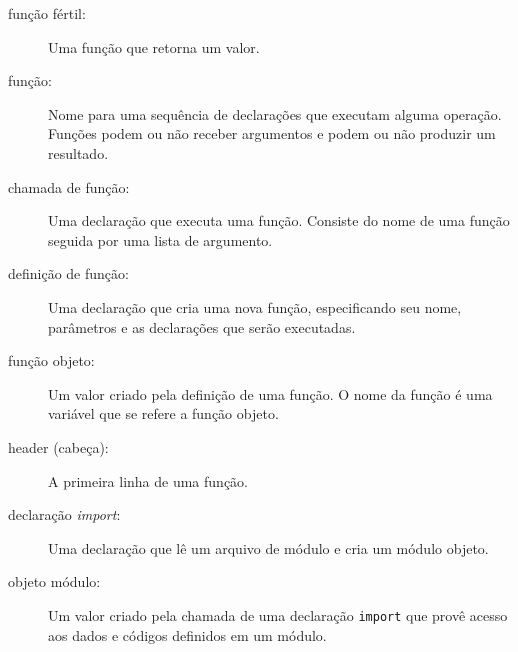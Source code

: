 \begin{description}
\item[função fértil:] Uma função que retorna um valor.

\item[função:] Nome para uma sequência de declarações que executam alguma
operação. Funções podem ou não receber argumentos e podem ou não produzir um
resultado.

\item[chamada de função:] Uma declaração que executa uma função. Consiste do
nome de uma função seguida por uma lista de argumento.

\item[definição de função:] Uma declaração que cria uma nova função,
especificando seu nome, parâmetros e as declarações que serão executadas.

\item[função objeto:] Um valor criado pela definição de uma função. O nome
da função é uma variável que se refere a função objeto.

\item[header (cabeça):] A primeira linha de uma função.

\item[declaração {\it import}:] Uma declaração que lê um arquivo de módulo e
cria um módulo objeto.

\item[objeto módulo:] Um valor criado pela chamada de uma declaração {\tt import}
que provê acesso aos dados e códigos definidos em um módulo.


\end{description}
